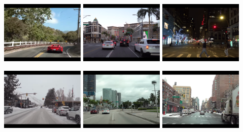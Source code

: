 \documentclass[12pt, letterpaper,cleardoubleempty,BCOR1cm]{scrbook}
\begin{document}
{\begin{center}
\includegraphics[trim={0 0.75cm 0 0.75cm},clip,width=0.3\textwidth]{./img/scenes/1.png}
\includegraphics[trim={0 0.75cm 0 0.75cm},clip,width=0.3\textwidth]{./img/scenes/2.png}
\includegraphics[trim={0 0.75cm 0 0.75cm},clip,width=0.3\textwidth]{./img/scenes/3.png}

\includegraphics[trim={0 0.75cm 0 0.75cm},clip,width=0.3\textwidth]{./img/scenes/4.png}
\includegraphics[trim={0 0.75cm 0 0.75cm},clip,width=0.3\textwidth]{./img/scenes/5.png}
\includegraphics[trim={0 0.75cm 0 0.75cm},clip,width=0.3\textwidth]{./img/scenes/6.png}


\end{center}}
\end{document}
